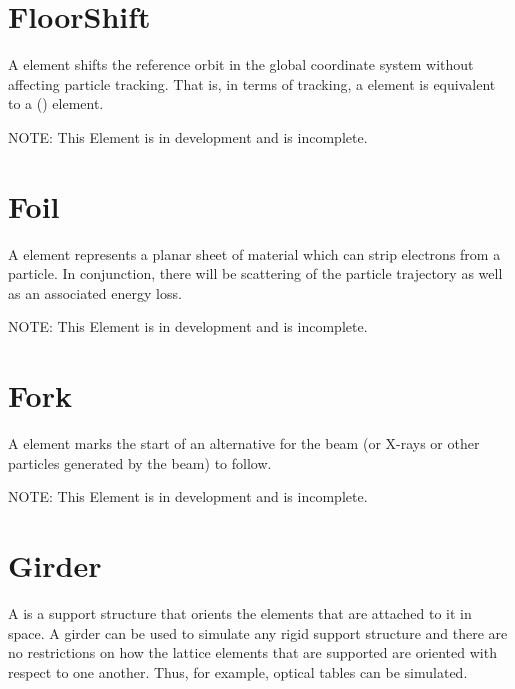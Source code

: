 \section{FloorShift}
\label{s:floorshift}

A  element shifts the reference orbit in the global coordinate system without
affecting particle tracking. That is, in terms of tracking, a  element is equivalent
to a  () element. 

NOTE: This Element is in development and is incomplete.

\section{Foil}
\label{s:foil}

A  element represents a planar sheet of material which can strip electrons from a particle.
In conjunction, there will be scattering of the particle trajectory as well as an associated energy
loss.

NOTE: This Element is in development and is incomplete.

\section{Fork}
\label{s:fork}

A  element marks the start of an alternative  for the beam
(or X-rays or other particles generated by the beam) to follow.

NOTE: This Element is in development and is incomplete.

\section{Girder}
\label{s:girder}

A  is a support structure that orients the elements that are attached to it in space. A
girder can be used to simulate any rigid support structure and there are no restrictions on how the
lattice elements that are supported are oriented with respect to one another.  Thus, for example,
optical tables can be simulated.

